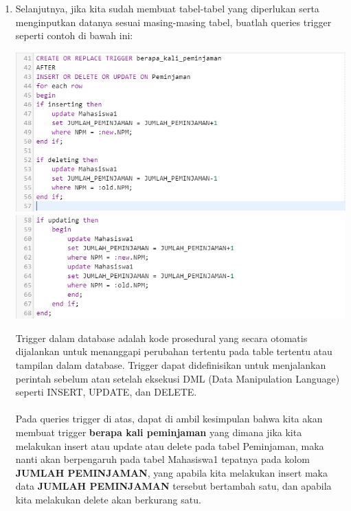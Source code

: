 \documentclass{article}
\begin{document}
\begin{enumerate}
     \item  Selanjutnya, jika kita sudah membuat tabel-tabel yang diperlukan serta menginputkan datanya sesuai masing-masing tabel, buatlah queries trigger seperti contoh di bawah ini:
     \begin{center}
     \includegraphics[width=.8\textwidth]{Figure/q9.PNG}
     \includegraphics[width=.8\textwidth]{Figure/q9-1.PNG}
     \end{center}
     Trigger dalam database adalah kode prosedural yang secara otomatis dijalankan untuk menanggapi perubahan tertentu pada table tertentu atau tampilan dalam database. Trigger dapat didefinisikan untuk menjalankan perintah sebelum atau setelah eksekusi DML (Data Manipulation Language) seperti INSERT, UPDATE, dan DELETE.\\
     \\
     Pada queries trigger di atas, dapat di ambil kesimpulan bahwa kita akan membuat trigger \textbf{berapa kali peminjaman} yang dimana jika kita melakukan insert atau update atau delete pada tabel Peminjaman, maka nanti akan berpengaruh pada tabel Mahasiswa1 tepatnya pada kolom \textbf{JUMLAH PEMINJAMAN}, yang apabila kita melakukan insert maka data \textbf{JUMLAH PEMINJAMAN} tersebut bertambah satu, dan apabila kita melakukan delete akan berkurang satu.
     

\end{enumerate}
\end{document}
